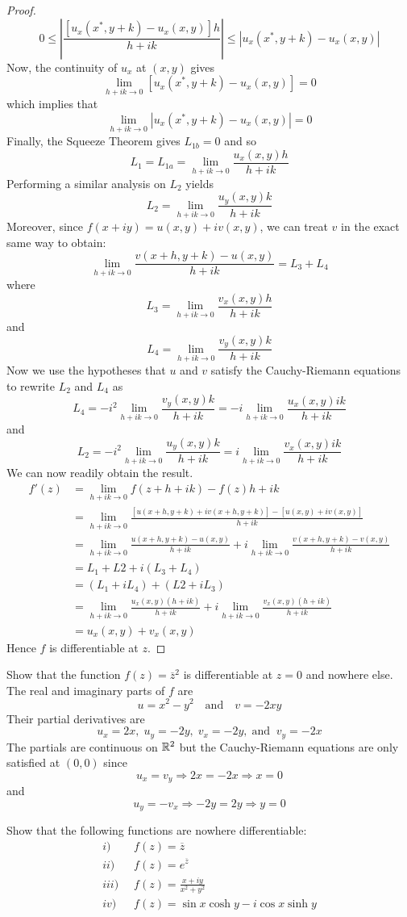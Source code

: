 \documentclass[handout]{ximera}
\begin{document}
\begin{proof}
\[
0\leq \left|\frac{[u_x(x^*,y+k)-u_x(x,y)]h}{h+ik}\right| \leq \left|u_x(x^*,y+k)-u_x(x,y)\right|
\]
Now, the continuity of $u_x$ at $(x,y)$ gives
\[
\lim_{h+ik \to 0} \left[u_x(x^*,y+k)-u_x(x,y)\right] =0
\]
which implies that
\[
\lim_{h+ik \to 0} \left|u_x(x^*,y+k)-u_x(x,y)\right| =0
\]
Finally, the Squeeze Theorem gives $L_{1b} = 0$ and so
\[
L_1 = L_{1a} = \lim_{h+ik \to 0} \frac{u_x(x,y)h}{h+ik}
\]
Performing a similar analysis on $L_2$ yields
 \[
L_2 = \lim_{h+ik \to 0} \frac{u_y(x,y)k}{h+ik}
\]
Moreover, since $f(x+iy) = u(x,y) + iv(x,y)$, we can treat $v$ in the exact same way to obtain:
\[
\lim_{h+ik \to 0} \frac{v(x+h, y+k) - u(x,y)}{h+ik} =  L_3 + L_4 
\]
where
\[
L_3 = \lim_{h+ik \to 0} \frac{v_x(x,y)h}{h+ik}
\]
and
 \[
L_4 = \lim_{h+ik \to 0} \frac{v_y(x,y)k}{h+ik}
\]
Now we use the hypotheses that $u$ and $v$ satisfy the Cauchy-Riemann equations to rewrite $L_2$ and $L_4$ as
\[
L_4 = -i^2\lim_{h+ik \to 0} \frac{v_y(x,y)k}{h+ik} = -i\lim_{h+ik \to 0} \frac{u_x(x,y)ik}{h+ik}
\]
and 
\[
L_2 = -i^2\lim_{h+ik \to 0} \frac{u_y(x,y)k}{h+ik} = i\lim_{h+ik \to 0} \frac{v_x(x,y)ik}{h+ik}
\]
We can now readily obtain the result.
\begin{align*}
f'(z) &= \lim_{h+ik \to 0} {f(z+h+ik)-f(z)}{h+ik}\\
      &=\lim_{h+ik \to 0} \frac{\left[u(x+h, y+k) +iv(x+h, y+k)\right] - \left[u(x,y) + iv(x,y)\right]}{h+ik} \\
      &=\lim_{h+ik \to 0} \frac{u(x+h, y+k) - u(x,y)}{h+ik} +i\lim_{h+ik \to 0} \frac{v(x+h, y+k) - v(x,y)}{h+ik} \\
      &= L_1+L2+ i(L_3 + L_4)\\
      &= ( L_1+  iL_4) +(L2+ iL_3 )\\
      &= \lim_{h+ik \to 0}\frac{u_x(x,y)(h+ik)}{h+ik} + i\lim_{h+ik \to 0}\frac{v_x(x,y)(h+ik)}{h+ik}\\
      &= u_x(x,y) + v_x(x,y)
\end{align*}
Hence $f$ is differentiable at $z$.
\end{proof}


\begin{example}
Show that the function $f(z) = \overline{z}^2$ is differentiable at $z = 0$ and nowhere else.\\
The real and imaginary parts of $f$ are
\[
u = x^2 - y^2 \quad \text{and} \quad v= -2xy
\]
Their partial derivatives are
\[
u_x = 2x, \;u_y = -2y,\; v_x = -2y, \; \text{and} \;\; v_y =-2x
\]
The partials are continuous on $\mathbb R^2$ but the Cauchy-Riemann equations are only satisfied at $(0,0)$ since
\[
u_x = v_y \Rightarrow 2x = -2x \Rightarrow x=0
\]
and
\[
u_y = -v_x \Rightarrow -2y = 2y \Rightarrow y=0
\]

\end{example}


\begin{problem}
Show that the following functions are nowhere differentiable:
\begin{align*}
i) \;\; & f(z) = \overline{z} \\
ii) \;\; & f(z) = e^{\overline{z}} \\
iii) \;\; & f(z) = \frac{x+iy}{x^2 + y^2} \\
iv) \;\; & f(z) = \sin x \cosh y - i \cos x \sinh y 
\end{align*}
\end{problem}
\end{document}
